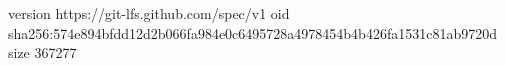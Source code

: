 version https://git-lfs.github.com/spec/v1
oid sha256:574e894bfdd12d2b066fa984e0c6495728a4978454b4b426fa1531c81ab9720d
size 367277
